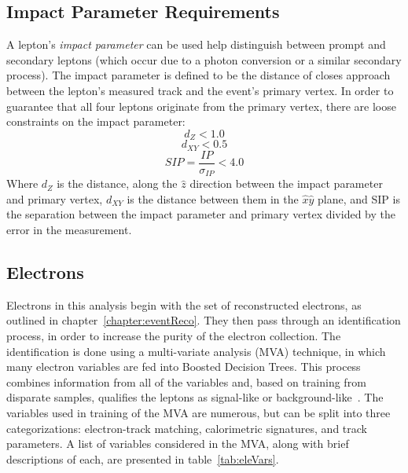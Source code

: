 \subsection{Impact Parameter Requirements}
A lepton's \emph{impact parameter} can be used help distinguish between prompt
and secondary leptons (which occur due to a photon conversion or a similar
secondary process). The impact parameter is defined to be the distance of closes
approach between the lepton's measured track and the event's primary vertex. In
order to guarantee that all four leptons originate from the primary vertex,
there are loose constraints on the impact parameter:
\begin{equation*}
    d_{Z} < 1.0
\end{equation*}
\begin{equation*}
    d_{XY} < 0.5
\end{equation*}
\begin{equation}
    SIP = \frac{IP}{\sigma_{IP}} < 4.0
\end{equation}
Where $d_{Z}$ is the distance, along the $\hat z$ direction between the impact
parameter and primary vertex, $d_{XY}$ is the distance between them in the
$\hat x \hat y$ plane, and SIP is the separation between the impact parameter
and primary vertex divided by the error in the measurement.


\subsection{Electrons}
\label{sub:eleDef}
Electrons in this analysis begin with the set of reconstructed electrons, as
outlined in chapter~\ref{chapter:eventReco}. They then pass through an identification
process, in order to increase the purity of the electron collection. The
identification is done using a multi-variate analysis (MVA) technique, in which
many electron variables are fed into Boosted Decision Trees\cite{BDTs, BDTs2}.
This process combines information from all of the variables and, based on
training from disparate samples, qualifies the leptons as signal-like or
background-like~\cite{elePerformance, zzHiggsMoriond}.
The variables used in training of the MVA are numerous, but can be split into
three categorizations: electron-track matching, calorimetric signatures, and
track parameters. A list of variables considered in the MVA, along with brief
descriptions of each, are presented in table~\ref{tab:eleVars}.

\clearpage

